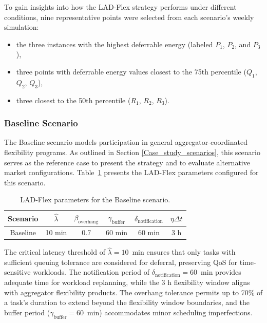 \documentclass[preprint,12pt]{elsarticle}
\begin{document}
To gain insights into how the LAD-Flex strategy performs under different conditions, nine representative points were selected from each scenario's weekly simulation:
\begin{itemize}
    \item the three instances with the highest deferrable energy (labeled $P_1$, $P_2$, and $P_3$),
    \item three points with deferrable energy values closest to the 75th percentile ($Q_1$, $Q_2$, $Q_3$),
    \item three closest to the 50th percentile ($R_1$, $R_2$, $R_3$).
\end{itemize}

\subsubsection{Baseline Scenario} \label{baseline_scenario}

The Baseline scenario models participation in general aggregator-coordinated flexibility programs. As outlined in Section \ref{Case_study_scenarios}, this scenario serves as the reference case to present the strategy and to evaluate alternative market configurations. Table~\ref{tab:parameters_baseline} presents the LAD-Flex parameters configured for this scenario.

\begin{table}[h!]
\centering
\begin{tabular}{@{}cccccc@{}}
\toprule
\textbf{Scenario} & $\hat{\lambda}$ & $\beta_\text{overhang}$ & $\gamma_{\text{buffer}}$ & $\delta_{\text{notification}}$ & $\eta{\Delta t}$ \\ \midrule
Baseline & 10 min & 0.7 & 60 min & 60 min & 3 h \\ \bottomrule
\end{tabular}
\caption{LAD-Flex parameters for the Baseline scenario.}
\label{tab:parameters_baseline}
\end{table}

The critical latency threshold of $\hat{\lambda} = 10$~min ensures that only tasks with sufficient queuing tolerance are considered for deferral, preserving QoS for time-sensitive workloads. The notification period of $\delta_{\text{notification}} = 60$~min provides adequate time for workload replanning, while the 3 h flexibility window aligns with aggregator flexibility products. The overhang tolerance permits up to 70\% of a task's duration to extend beyond the flexibility window boundaries, and the buffer period ($\gamma_{\text{buffer}} = 60$~min) accommodates minor scheduling imperfections.
\end{document}
